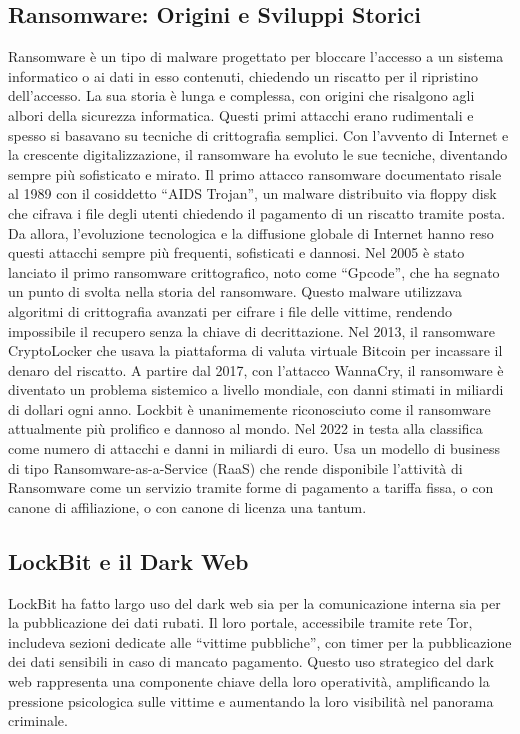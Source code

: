 \documentclass[a4paper,12pt]{article}
\begin{document}
\subsection{Ransomware: Origini e Sviluppi Storici}
Ransomware è un tipo di malware progettato per bloccare l'accesso a un sistema informatico o ai dati in esso contenuti, chiedendo un riscatto per il ripristino dell'accesso. La sua storia è lunga e complessa, con origini che risalgono agli albori della sicurezza informatica. Questi primi attacchi erano rudimentali e spesso si basavano su tecniche di crittografia semplici. Con l'avvento di Internet e la crescente digitalizzazione, il ransomware ha evoluto le sue tecniche, diventando sempre più sofisticato e mirato.
Il primo attacco ransomware documentato risale al 1989 con il cosiddetto “AIDS Trojan”, un malware distribuito via floppy disk che cifrava i file degli utenti chiedendo il pagamento di un riscatto tramite posta. Da allora, l'evoluzione tecnologica e la diffusione globale di Internet hanno reso questi attacchi sempre più frequenti, sofisticati e dannosi.
Nel 2005 è stato lanciato il primo ransomware crittografico, noto come “Gpcode”, che ha segnato un punto di svolta nella storia del ransomware. Questo malware utilizzava algoritmi di crittografia avanzati per cifrare i file delle vittime, rendendo impossibile il recupero senza la chiave di decrittazione.
Nel 2013, il ransomware CryptoLocker che usava la piattaforma di valuta virtuale Bitcoin per incassare il denaro del riscatto.
A partire dal 2017, con l'attacco WannaCry, il ransomware è diventato un problema sistemico a livello mondiale, con danni stimati in miliardi di dollari ogni anno.
Lockbit è unanimemente riconosciuto come il ransomware attualmente più prolifico e dannoso al mondo. Nel 2022 in testa alla classifica come numero di attacchi e danni in miliardi di euro. Usa un modello di business di tipo Ransomware-as-a-Service (RaaS) che rende disponibile l'attività di Ransomware come un servizio tramite forme di pagamento a tariffa fissa, o con canone di affiliazione, o con canone di licenza una tantum.

\subsection{LockBit e il Dark Web}
LockBit ha fatto largo uso del dark web sia per la comunicazione interna sia per la pubblicazione dei dati rubati. Il loro portale, accessibile tramite rete Tor, includeva sezioni dedicate alle “vittime pubbliche”, con timer per la pubblicazione dei dati sensibili in caso di mancato pagamento. Questo uso strategico del dark web rappresenta una componente chiave della loro operatività, amplificando la pressione psicologica sulle vittime e aumentando la loro visibilità nel panorama criminale.
\end{document}
